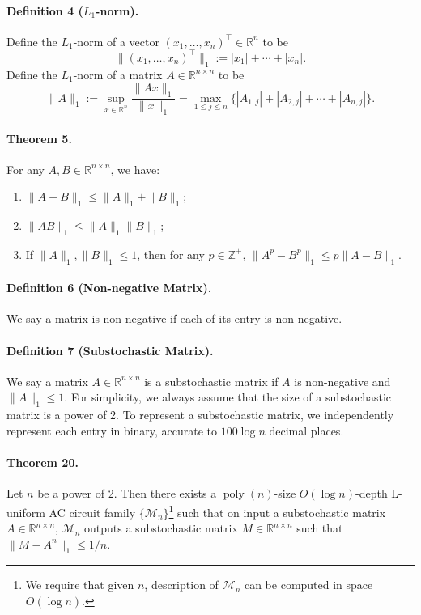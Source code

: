 \documentclass[10pt,a4paper]{article}
\begin{document}
\paragraph{Definition 4 ($L_1$-norm).} Define the $L_1$-norm of a vector $(x_1,\ldots,x_n)^\top\in\mathbb R^n$ to be
\[\|(x_1,\ldots,x_n)^\top\|_1:=|x_1|+\cdots+|x_n|.\]
Define the $L_1$-norm of a matrix $A\in\mathbb R^{n\times n}$ to be
\[\|A\|_1:=\sup_{x\in\mathbb R^n}\frac{\|Ax\|_1}{\|x\|_1}=\max_{1\le j\le n}\{|A_{1,j}|+|A_{2,j}|+\cdots+|A_{n,j}|\}.\]
\paragraph{Theorem 5.} For any $A,B\in\mathbb R^{n\times n}$, we have:
\begin{enumerate}\item $\|A+B\|_1\le\|A\|_1+\|B\|_1$;\item $\|AB\|_1\le\|A\|_1\|B\|_1$;\item If $\|A\|_1,\|B\|_1\le1$, then for any $p\in\mathbb Z^+$, $\|A^p-B^p\|_1\le p\|A-B\|_1$.\end{enumerate}
\paragraph{Definition 6 (Non-negative Matrix).} We say a matrix is non-negative if each of its entry is non-negative.
\paragraph{Definition 7 (Substochastic Matrix).} We say a matrix $A\in\mathbb R^{n\times n}$ is a substochastic matrix if $A$ is non-negative and $\|A\|_1\le1$.
For simplicity, we always assume that the size of a substochastic matrix is a power of 2. To represent a substochastic matrix, we independently represent each entry in binary, accurate to $100\log n$ decimal places.

\paragraph{Theorem 20.} Let $n$ be a power of 2. Then there exists a $\operatorname{poly}(n)$-size $O(\log n)$-depth L-uniform AC circuit family $\{\mathcal M_n\}$\footnote{We require that given $n$, description of $\mathcal M_n$ can be computed in space $O(\log n)$.} such that on input a substochastic matrix $A\in\mathbb R^{n\times n}$, $\mathcal M_n$ outputs a substochastic matrix $M\in\mathbb R^{n\times n}$ such that $\|M-A^n\|_1\le1/n$.
\end{document}
